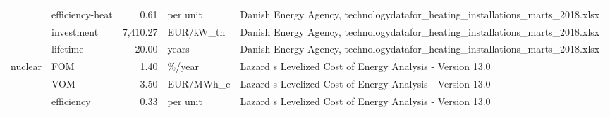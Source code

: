\begin{longtable}{p{5cm}p{3cm}rp{3cm}p{11cm}}
                      & efficiency-heat &           0.61 &                          per unit &                                                                                                                                                                                                                                                        Danish Energy Agency, technologydatafor\_heating\_installations\_marts\_2018.xlsx \\
                      & investment &       7,410.27 &                         EUR/kW\_th &                                                                                                                                                                                                                                                        Danish Energy Agency, technologydatafor\_heating\_installations\_marts\_2018.xlsx \\
                      & lifetime &          20.00 &                             years &                                                                                                                                                                                                                                                        Danish Energy Agency, technologydatafor\_heating\_installations\_marts\_2018.xlsx \\
nuclear & FOM &           1.40 &                            \%/year &                                                                                                                                                                                                                                                                            Lazard s Levelized Cost of Energy Analysis - Version 13.0 \\
                      & VOM &           3.50 &                         EUR/MWh\_e &                                                                                                                                                                                                                                                                            Lazard s Levelized Cost of Energy Analysis - Version 13.0 \\
                      & efficiency &           0.33 &                          per unit &                                                                                                                                                                                                                                                                            Lazard s Levelized Cost of Energy Analysis - Version 13.0 \\

\end{longtable}
